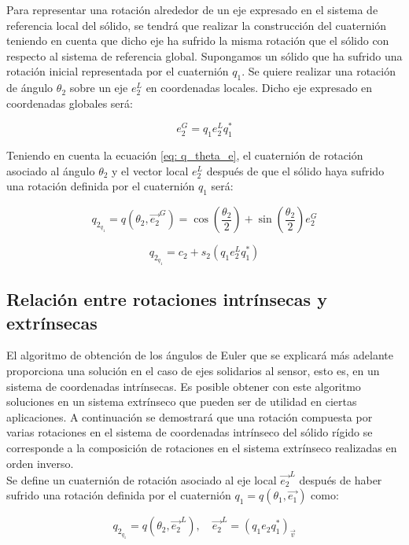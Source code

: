 \documentclass[12pt, a4paper]{report}
\begin{document}
Para representar una rotación alrededor de un eje expresado en el sistema de referencia local del sólido, se tendrá que realizar la construcción del cuaternión teniendo en cuenta que dicho eje ha sufrido la misma rotación que el sólido con respecto al sistema de referencia global. Supongamos un sólido que ha sufrido una rotación inicial representada por el cuaternión $q_1$. Se quiere realizar una rotación de ángulo $\theta_2$ sobre un eje $e_2^L$ en coordenadas locales. Dicho eje expresado en coordenadas globales será:

$$ e_2^G = q_1e_2^Lq_1^* $$

Teniendo en cuenta la ecuación \eqref{eq: q_theta_e}, el cuaternión de rotación asociado al ángulo $\theta_2$ y el vector local $e_2^L$ después de que el sólido haya sufrido una rotación definida por el cuaternión $q_1$ será:

$$ q_{2_{q_1}} = q(\theta_2, \vec{e_2}^G) = \cos\left( \frac{\theta_2}{2}\right) + \sin\left( \frac{\theta_2}{2} \right)e_2^G $$

\begin{equation} \label{eq: q_2_q_1}
q_{2_{q_1}} =  c_2 + s_2(q_1e_2^Lq_1^*)
\end{equation} 

\subsection{Relación entre rotaciones intrínsecas y extrínsecas}

El algoritmo de obtención de los ángulos de Euler que se explicará más adelante proporciona una solución en el caso de ejes solidarios al sensor, esto es, en un sistema de coordenadas intrínsecas. Es posible obtener con este algoritmo soluciones en un sistema extrínseco que pueden ser de utilidad en ciertas aplicaciones. A continuación se demostrará que una rotación compuesta por varias rotaciones en el sistema de coordenadas intrínseco del sólido rígido se corresponde a la composición de rotaciones en el sistema extrínseco realizadas en orden inverso.\\

Se define un cuaternión de rotación asociado al eje local $\vec{e_2}^L$ después de haber sufrido una rotación definida por el cuaternión $q_1 = q\left( \theta_1 , \vec{e_1} \right)$ como:

\begin{equation}
q_{2_{q_1}} = q\left(\theta_2 , \vec{e_2}^L \right) , \quad \vec{e_2}^L = (q_1e_2q_1^*)_{\vec{v}}
\end{equation}
\end{document}
